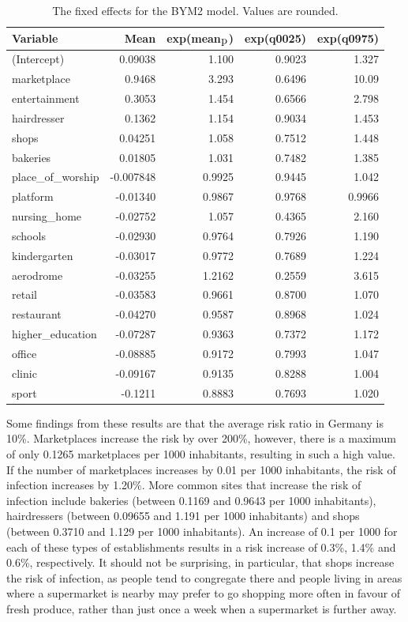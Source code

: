 \begin{table}[H] 
\caption{The fixed effects for the BYM2 model. Values are rounded. \label{fixedInfraGermany}}
\begin{tabular}{l r r r r}
\toprule
\textbf{Variable}	& \textbf{Mean}	& \textbf{exp(mean$_{\hbox{p}}$)} & \textbf{exp(q0025)} & \textbf{exp(q0975)} \\
\midrule
(Intercept) & 0.09038 & 1.100 & 0.9023 & 1.327\\
marketplace & 0.9468 & 3.293  & 0.6496  & 10.09 \\
entertainment & 0.3053 & 1.454 & 0.6566 & 2.798\\
hairdresser & 0.1362 & 1.154 & 0.9034 & 1.453\\
shops & 0.04251 & 1.058 & 0.7512 & 1.448\\
bakeries & 0.01805 & 1.031 & 0.7482 & 1.385\\
place\_of\_worship & -0.007848 & 0.9925 & 0.9445 & 1.042\\
platform & -0.01340 & 0.9867 & 0.9768 & 0.9966\\
nursing\_home & -0.02752 & 1.057 & 0.4365 & 2.160\\
schools & -0.02930 & 0.9764 & 0.7926 & 1.190\\
kindergarten & -0.03017 & 0.9772 & 0.7689 & 1.224\\
aerodrome & -0.03255 & 1.2162 & 0.2559 & 3.615\\
retail & -0.03583 & 0.9661 & 0.8700 & 1.070\\
restaurant & -0.04270 & 0.9587 & 0.8968 & 1.024\\
higher\_education & -0.07287 & 0.9363 & 0.7372 & 1.172\\
office & -0.08885  & 0.9172 & 0.7993 & 1.047\\
clinic & -0.09167 & 0.9135 & 0.8288 & 1.004\\
sport & -0.1211  & 0.8883 & 0.7693 & 1.020\\
\bottomrule
\end{tabular}
\end{table}
Some findings from these results are that the average risk ratio in Germany is 10\%. Marketplaces increase the risk by over 200\%, however, there is a maximum of only 0.1265 marketplaces per 1000 inhabitants, resulting in such a high value. If the number of marketplaces increases by 0.01 per 1000 inhabitants, the risk of infection increases by 1.20\%. More common sites that increase the risk of infection include bakeries (between 0.1169 and 0.9643 per 1000 inhabitants), hairdressers (between 0.09655 and 1.191 per 1000 inhabitants) and shops (between 0.3710 and 1.129 per 1000 inhabitants). An increase of 0.1 per 1000 for each of these types of establishments results in a risk increase of 0.3\%, 1.4\% and 0.6\%, respectively. It should not be surprising, in particular, that shops increase the risk of infection, as people tend to congregate there and people living in areas where a supermarket is nearby may prefer to go shopping more often in favour of fresh produce, rather than just once a week when a supermarket is further away. \\
